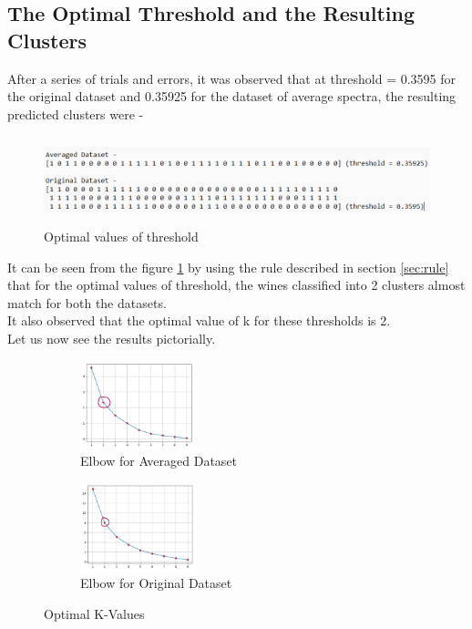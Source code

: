 \documentclass{article}
\begin{document}
\subsection{The Optimal Threshold and the Resulting Clusters}
After a series of trials and errors, it was observed that at threshold = 0.3595 for the original dataset and 0.35925 for the dataset of average spectra, the resulting predicted clusters were - \\
\begin{figure}[H]
	\centering
	\includegraphics[height=1in]{Thresholds .png}
	\caption[Optional Caption]{Optimal values of threshold}
	\label{fig:fig6}
\end{figure}
It can be seen from the figure \ref{fig:fig6} by using the rule described in section \ref{sec:rule} that for the optimal values of threshold, the wines classified into 2 clusters almost match for both the datasets. \\
\newline
It also observed that the optimal value of k for these thresholds is 2.\\  
\newline
Let us now see the results pictorially.\\
\begin{figure}[H]
\centering
\begin{subfigure}{0.5\textwidth}
\centering
\includegraphics[height=1in]{Optimal k for avg dataset.png}
\caption[Optional Caption]{Elbow for Averaged Dataset}
\end{subfigure}%
\begin{subfigure}{0.5\textwidth}
\centering
\includegraphics[height=1in]{Optimal k for og dataset.png}
\caption[Optional Caption]{Elbow for Original Dataset}
\end{subfigure}
\caption[Optional Caption]{Optimal K-Values}
\end{figure}
\end{document}
